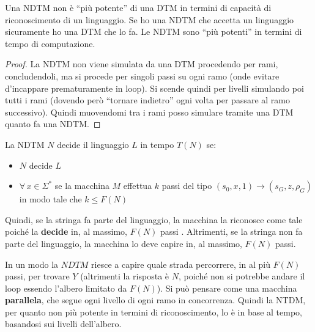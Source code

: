 \begin{definizione}
  Una NDTM non è ``più potente'' di una DTM in termini di capacità di
  riconoscimento di un linguaggio. Se ho una NDTM che accetta un linguaggio
  sicuramente ho una DTM che lo fa. Le NDTM sono ``più potenti'' in termini di tempo di computazione.
\end{definizione}
\begin{proof}
  La NDTM non viene simulata da una DTM procedendo per rami, concludendoli, ma
  si procede per singoli passi su ogni ramo (onde evitare d'incappare
  prematuramente in loop). Si scende quindi per livelli simulando poi tutti i
  rami (dovendo però ``tornare indietro'' ogni volta per passare al ramo
  successivo). Quindi muovendomi tra i rami posso simulare tramite una DTM
  quanto fa una NDTM.
\end{proof}
\begin{definizione}
  La NDTM $N$ decide il linguaggio $L$ in tempo $T(N)$ se:
  \begin{itemize}
    \item $N$ decide $L$
    \item $\forall\,x\in \Sigma^*$ se la macchina $M$ effettua $k$ passi del tipo $(s_0,x,1)\to(s_G, z, \rho_G)$ in modo tale che $k\leq F(N)$
  \end{itemize}
  Quindi, se la stringa fa parte del linguaggio, la macchina la riconosce come tale poiché la \textbf{decide} in, al massimo, $F(N)$ passi . Altrimenti, se la stringa non fa parte del linguaggio, la macchina lo deve capire in, al massimo, $F(N)$ passi.
\end{definizione}
In un modo la $NDTM$ riesce a capire quale strada percorrere, in al più $F(N)$ passi, per trovare $Y$ (altrimenti la risposta è $N$, poiché non si potrebbe andare il loop essendo l'albero limitato da $F(N)$). Si può pensare come una macchina \textbf{parallela}, che segue ogni livello di ogni ramo in concorrenza.
Quindi la NTDM, per quanto non più potente in termini di riconoscimento, lo è in
base al tempo, basandosi sui livelli dell'albero.
